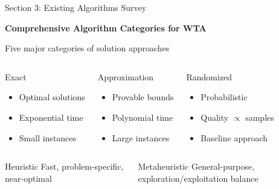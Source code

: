 \documentclass[aspectratio=43,8pt]{beamer}
\begin{document}
\begin{frame}{Section 3: Existing Algorithms Survey}
\begin{center}
{\Large\textcolor{primaryblue}{\textbf{Comprehensive Algorithm Categories for WTA}}}

\vspace{0.5cm}
{\normalsize Five major categories of solution approaches}
\end{center}

\vspace{0.3cm}
\begin{columns}[t]
\begin{block}{Exact}
\begin{itemize}
    \item Optimal solutions
    \item Exponential time
    \item Small instances
\end{itemize}
\end{block}

\begin{alertblock}{Approximation}
\begin{itemize}
    \item Provable bounds
    \item Polynomial time
    \item Large instances
\end{itemize}
\end{alertblock}

\begin{exampleblock}{Randomized}
\begin{itemize}
    \item Probabilistic
    \item Quality $\propto$ samples
    \item Baseline approach
\end{itemize}
\end{exampleblock}
\end{columns}

\vspace{0.3cm}
\begin{columns}[c]
\begin{block}{Heuristic}
Fast, problem-specific, near-optimal
\end{block}

\begin{alertblock}{Metaheuristic}
General-purpose, exploration/exploitation balance
\end{alertblock}
\end{columns}
\end{frame}
\end{document}
